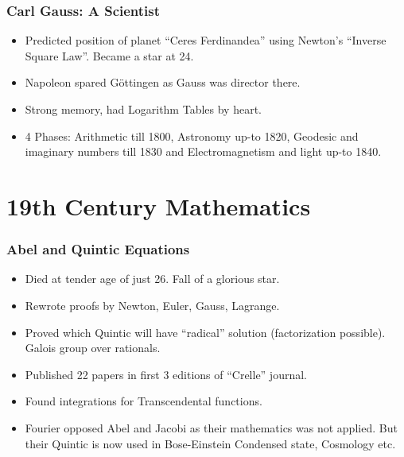 \begin{frame}[fragile]
\frametitle{Carl Gauss: A Scientist}
\begin{itemize}
\item Predicted position of planet ``Ceres Ferdinandea'' using Newton's ``Inverse Square Law''.  Became a star at 24.
\item Napoleon spared G\"ottingen as Gauss was director there.
\item Strong memory, had Logarithm Tables by heart.
\item 4 Phases: Arithmetic till 1800, Astronomy up-to 1820, Geodesic and imaginary numbers till 1830 and Electromagnetism and light up-to 1840.
\end{itemize}
\end{frame}

\section{19th Century Mathematics}

\begin{frame}[fragile]
\frametitle{Abel and Quintic Equations}
\begin{itemize}
\item Died at tender age of just 26. Fall of a glorious star.
\item Rewrote proofs by Newton, Euler, Gauss, Lagrange.
\item Proved which Quintic will have ``radical'' solution (factorization possible). Galois group over rationals.
\item Published 22 papers in first 3 editions of ``Crelle'' journal.
\item Found integrations for Transcendental functions.
\item Fourier opposed Abel and Jacobi as their mathematics was not applied. But their Quintic is now used in Bose-Einstein Condensed state, Cosmology etc.
\end{itemize}
\end{frame}

